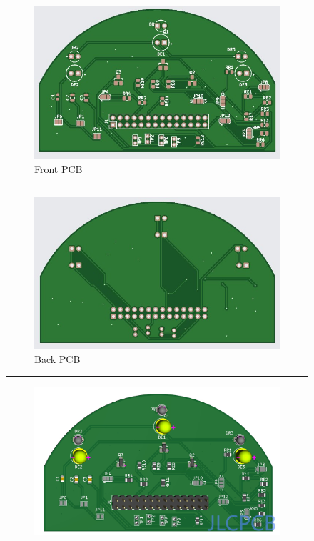 \documentclass[class=report,11pt,crop=false]{standalone}
\begin{document}
\begin{figure}[htbp]
    \begin{subfigure}[b]{0.6\linewidth}
        \includegraphics[width=\linewidth]{EEE3088F_final_report_latex_template-2//Figures/Front_PCB.jpg}
        \caption{Front PCB}
        \label{fig:PCB_Front}
    \end{subfigure}
    \hrule %
    \begin{subfigure}[b]{0.6\linewidth}
        \includegraphics[width=\linewidth]{EEE3088F_final_report_latex_template-2//Figures/Back_PCB.jpg}
        \caption{Back PCB}
        \label{fig:PCB_back}
    \end{subfigure}
    \hrule %
    \begin{subfigure}[b]{0.6\linewidth}
        \includegraphics[width=\linewidth]{EEE3088F_final_report_latex_template-2//Figures/3D_Model_2.jpg}

\end{subfigure}
\end{figure}
\end{document}
